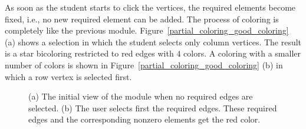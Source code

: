 \documentclass[12pt, twoside,a4paper,toc=bibliography]{scrbook}
\begin{document}
As soon as the student starts to click the vertices, the required elements
become fixed, i.e., no new required element can be added.
The process of coloring is completely like the previous module.
Figure~\ref{partial_coloring_good_coloring} (a) shows a selection in which 
the student selects only column vertices. The result is a star bicoloring
restricted to red edges with $4$ colors.
A coloring with a smaller number of colors 
is shown in Figure~\ref{partial_coloring_good_coloring} (b)
in which a row vertex is selected first.

\begin{figure}
\centering
{}
\hfill
{}
\caption{
(a) The initial view of the module when no required edges are selected.
(b) The user selects first the required edges. These required edges and the corresponding
nonzero elements get the red color.}
\label{partial_coloring_bad_coloring}
\end{figure}
\end{document}
